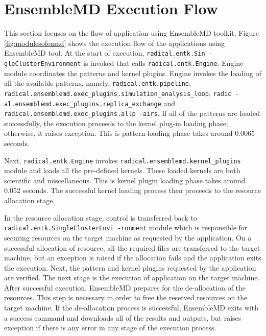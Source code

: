 \documentclass[10pt]{ruthesis}
\begin{document}
\section{EnsembleMD Execution Flow}
This section focuses on the flow of application using EnsembleMD toolkit. Figure \ref{fig:modulesofenmd} shows the execution flow of the applications using EnsembleMD tool. At the start of execution, \texttt{radical.entk.Sin
-gleClusterEnvironment} is invoked that calls \texttt{radical.entk.Engine}. Engine module coordinates the patterns and kernel plugins. Engine invokes the loading of all the available patterns, namely, \texttt{radical.entk.pipeline},  \texttt{radical.ensemblemd.exec\_plugins.simulation\_analysis\_loop},  \texttt{radic
-al.ensemblemd.exec\_plugins.replica\_exchange} and \texttt{radical.ensemblemd.exec\_plugins.allp
-airs}. If all of the patterns are loaded successfully, the execution proceeds to the kernel plug-in loading phase; otherwise, it raises exception. This is pattern loading phase takes around 0.0065 seconds.

Next, \texttt{radical.entk.Engine} invokes \texttt{radical.ensemblemd.kernel\_plugins} module and loads all the pre-defined kernels. These loaded kernels are both scientific and miscellaneous. This is kernel plugin loading phase takes around 0.052 seconds. The successful kernel loading process then proceeds to the resource allocation stage.

In the resource allocation stage, control is transferred back to \texttt{radical.entk.SingleClusterEnvi
-ronment} module which is responsible for securing resources on the target machine as requested by the application. On a successful allocation of resource, all the required files are transferred to the target machine, but an exception is raised if the allocation fails and the application exits the execution. Next, the pattern and kernel plugins requested by the application are verified. The next stage is the execution of application on the target machine. After successful execution, EnsembleMD prepares for the de-allocation of the resources. This step is necessary in order to free the reserved resources on the target machine. If the de-allocation process is successful, EnsembleMD exits with a success command and downloads all of the results and outputs, but raises exception if there is any error in any stage of the execution process.
\end{document}
